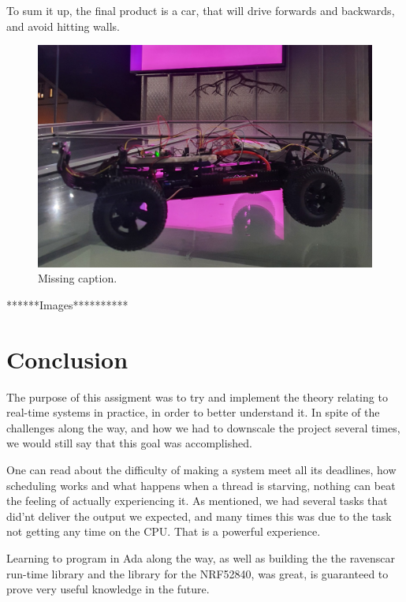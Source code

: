 \documentclass{article}
\begin{document}
To sum it up, the final product is a car, that will drive forwards and backwards, and avoid hitting walls. 

\begin{figure}[H]
	\centering
	\includegraphics[width=\linewidth]{showcase.png}
	\caption{Missing caption.}
	\label{showcase}
\end{figure}

******Images**********
\section{Conclusion}

The purpose of this assigment was to try and implement the theory relating to real-time systems in practice, in order to better understand it. In spite of the challenges along the way, and how we had to downscale the project several times, we would still say that this goal was accomplished.

One can read about the difficulty of making a system meet all its deadlines, how scheduling works and what happens when a thread is starving, nothing can beat the feeling of actually experiencing it. As mentioned, we had several tasks that did'nt deliver the output we expected, and many times this was due to the task not getting any time on the CPU. That is a powerful experience. 

Learning to program in Ada along the way, as well as building the the ravenscar run-time library and the library for the NRF52840, was great, is guaranteed to prove very useful knowledge in the future. 


\newpage
\nocite{*}


\end{document}
